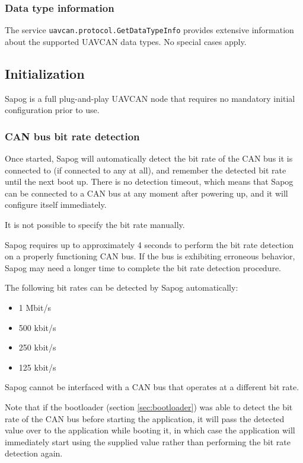 \documentclass{zubaxdoc}
\begin{document}
\subsubsection{Data type information}

The service \verb|uavcan.protocol.GetDataTypeInfo| provides extensive information about the
supported UAVCAN data types.
No special cases apply.

\subsection{Initialization}

Sapog is a full plug-and-play UAVCAN node that requires no mandatory initial configuration prior to use.

\subsubsection{CAN bus bit rate detection}

Once started, Sapog will automatically detect the bit rate of the CAN bus it is connected to
(if connected to any at all), and remember the detected bit rate until the next boot up.
There is no detection timeout, which means that Sapog can be connected to a CAN bus at
any moment after powering up, and it will configure itself immediately.

It is not possible to specify the bit rate manually.

Sapog requires up to approximately 4 seconds to perform the bit rate detection on a properly
functioning CAN bus.
If the bus is exhibiting erroneous behavior, Sapog may need a longer time to complete the bit rate
detection procedure.

The following bit rates can be detected by Sapog automatically:
\begin{itemize}
\item 1 Mbit/s
\item 500 kbit/s
\item 250 kbit/s
\item 125 kbit/s
\end{itemize}
Sapog cannot be interfaced with a CAN bus that operates at a different bit rate.

Note that if the bootloader (section \ref{sec:bootloader}) was able to detect the bit rate of the CAN bus
before starting the application,
it will pass the detected value over to the application while booting it,
in which case the application will immediately start using the supplied value rather than
performing the bit rate detection again.
\end{document}
